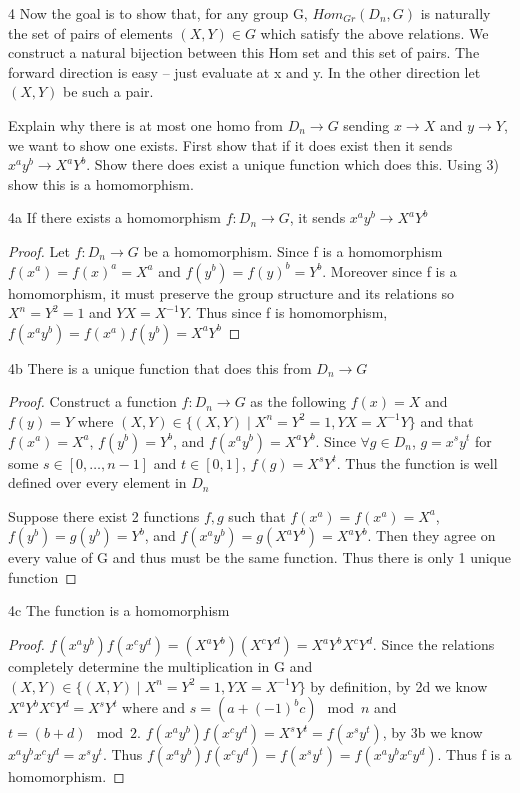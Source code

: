 \documentclass{article}
\begin{document}
\bigskip 

\begin{PROB}{4}\label{Problem 4.}
    Now the goal is to show that, for any group G, $Hom_{Gr}(D_n,G)$ is naturally the set of pairs of elements $(X,Y) \in G$ which satisfy the above relations. We construct a natural bijection between this Hom set and this set of pairs. The forward direction is easy -- just evaluate at x and y. In the other direction let $(X,Y)$ be such a pair. 
    
    Explain why there is at most one homo from $D_n \to G$ sending $x \to X$ and $y \to Y$, we want to show one exists. First show that if it does exist then it sends $x^a y^b \to X^a Y^b$. Show there does exist a unique function which does this. Using 3) show this is a homomorphism. 
\end{PROB}

\begin{claim}{4a}
    If there exists a homomorphism $f: D_n \to G$, it sends $x^a y^b \to X^a Y^b$
\end{claim}
\begin{proof}
    Let $f: D_n \to G$ be a homomorphism. Since f is a homomorphism $f(x^a) = f(x)^a = X^a$ and $f(y^b) = f(y)^b = Y^b$. Moreover since f is a homomorphism, it must preserve the group structure and its relations so $X^n = Y^2 = 1$ and $YX = X^{-1}Y$. Thus since f is homomorphism, $f(x^a y^b) = f(x^a)f(y^b) = X^aY^b$
\end{proof}

\begin{claim}{4b}
    There is a unique function that does this from $D_n \to G$
\end{claim}
\begin{proof}
    Construct a function $f: D_n \to G$ as the following $f(x) = X$ and $f(y)= Y$ where $(X, Y) \in \{(X, Y) \mid X^n = Y^2 = 1, YX = X^{-1}Y\}$ and that $f(x^a) = X^a$, $f(y^b) = Y^b$, and $f(x^ay^b) = X^aY^b$. Since $\forall g \in D_n$, $g = x^s y^t$ for some $s \in [0, \ldots, n-1]$ and $t \in [0, 1]$, $f(g) = X^sY^t$. Thus the function is well defined over every element in $D_n$

    Suppose there exist 2 functions $f, g$ such that $f(x^a) = f(x^a) = X^a$, $f(y^b) = g(y^b) = Y^b$, and $f(x^ay^b) = g(X^aY^b) = X^aY^b$. Then they agree on every value of G and thus must be the same function. Thus there is only 1 unique function
\end{proof}

\begin{claim}{4c}
    The function is a homomorphism
\end{claim}
\begin{proof}
    $f(x^ay^b)f(x^cy^d) = (X^aY^b)(X^cY^d) = X^aY^bX^cY^d$. Since the relations completely determine the multiplication in G and $(X, Y) \in \{(X, Y) \mid X^n = Y^2 = 1, YX = X^{-1}Y\}$ by definition, by 2d we know $X^aY^bX^cY^d = X^sY^t$ where and $s = (a + (-1)^bc) \mod n$ and $t = (b + d)\mod 2$. $f(x^ay^b)f(x^cy^d) = X^sY^t = f(x^sy^t)$, by 3b we know $x^ay^bx^cy^d = x^sy^t$. Thus $f(x^ay^b)f(x^cy^d) =f(x^sy^t) = f(x^ay^bx^cy^d)$. Thus f is a homomorphism.
\end{proof}
\end{document}

